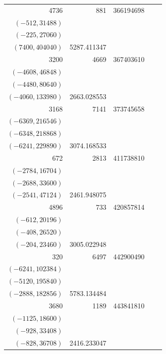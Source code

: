 \documentclass[11pt]{article}
\begin{document}
\begin{longtable}{r r r l r}
4736 & 881 & 366194698 & \begin{tabular}[t]{@{}l@{}}$(-592,30192)$\\$(-512,31488)$\\$(-225,27060)$\\$(7400,404040)$\end{tabular} & 5287.411347\\[5pt]
3200 & 4669 & 367403610 & \begin{tabular}[t]{@{}l@{}}$(-4640,32480)$\\$(-4608,46848)$\\$(-4480,80640)$\\$(-4060,133980)$\end{tabular} & 2663.028553\\[5pt]
3168 & 7141 & 373745658 & \begin{tabular}[t]{@{}l@{}}$(-7128,30888)$\\$(-6369,216546)$\\$(-6348,218868)$\\$(-6241,229890)$\end{tabular} & 3074.168533\\[5pt]
672 & 2813 & 411738810 & \begin{tabular}[t]{@{}l@{}}$(-2809,6254)$\\$(-2784,16704)$\\$(-2688,33600)$\\$(-2541,47124)$\end{tabular} & 2461.948075\\[5pt]
4896 & 733 & 420857814 & \begin{tabular}[t]{@{}l@{}}$(-729,4050)$\\$(-612,20196)$\\$(-408,26520)$\\$(-204,23460)$\end{tabular} & 3005.022948\\[5pt]
320 & 6497 & 442900490 & \begin{tabular}[t]{@{}l@{}}$(-6408,61944)$\\$(-6241,102384)$\\$(-5120,195840)$\\$(-2888,182856)$\end{tabular} & 5783.134484\\[5pt]
3680 & 1189 & 443841810 & \begin{tabular}[t]{@{}l@{}}$(-1160,12760)$\\$(-1125,18600)$\\$(-928,33408)$\\$(-828,36708)$\end{tabular} & 2416.233047\\[5pt]

\end{longtable}
\end{document}
